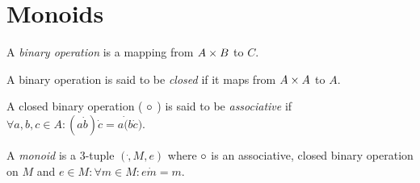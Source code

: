 \chapter{Monoids}

A \emph{binary operation} is a mapping from $A \cross B$ to $ C $.

A binary operation is said to be \emph{closed} if it maps from $A
\cross A$ to $A$.

A closed binary operation ( $ \dot $ ) is said to be
\emph{associative} if $ \forall a,b,c \in A: ( a \dot b ) \dot c = a
\dot ( b \dot c )$.

A \emph{monoid} is a 3-tuple $(\dot, M, e)$ where $\dot$ is an
associative, closed binary operation on $M$ and $ e \in M: \forall m
\in M: e \dot m = m $.
